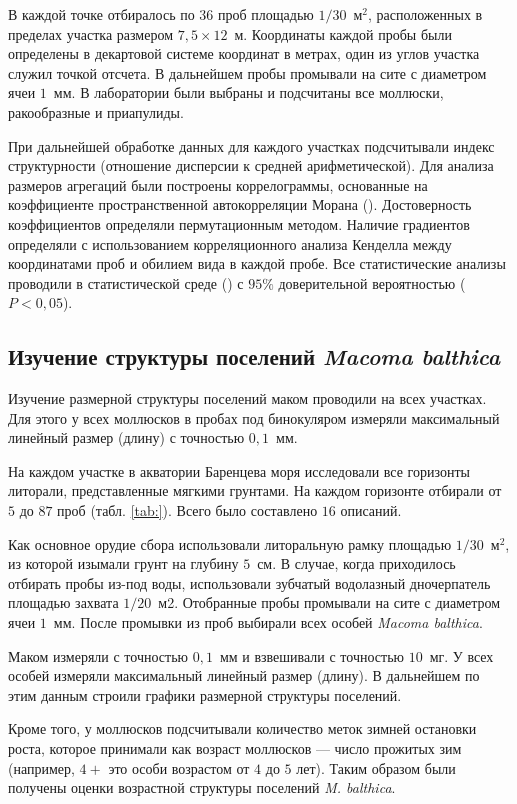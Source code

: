 В каждой точке отбиралось по $36$ проб площадью $1/30$~м$^2$, расположенных в пределах участка размером $7,5 \times 12$~м. 
Координаты каждой пробы были определены в декартовой системе координат в метрах, один из углов участка служил точкой отсчета. 
В дальнейшем пробы промывали на сите с диаметром ячеи $1$~мм. 
В лаборатории были выбраны и  подсчитаны все моллюски, ракообразные и приапулиды.

При дальнейшей обработке данных для каждого участках подсчитывали индекс структурности (отношение дисперсии к средней арифметической). 
Для анализа размеров агрегаций были построены коррелограммы, основанные на коэффициенте пространственной автокорреляции Морана (\cite{ncf}).
Достоверность коэффициентов определяли пермутационным методом.
Наличие градиентов определяли с использованием корреляционного анализа Кенделла между координатами проб и обилием вида в каждой пробе. 
Все статистические анализы проводили в статистической среде \R{} (\cite{R_2014}) с $95\%$ доверительной вероятностью ($P < 0,05$).



	
	\subsection{Изучение структуры поселений {\it Macoma balthica}}
Изучение размерной структуры поселений маком проводили на всех участках.
Для этого у всех моллюсков в пробах под бинокуляром измеряли максимальный линейный размер (длину) с точностью $0,1$~мм.

  На каждом участке в акватории Баренцева моря исследовали все  горизонты литорали, представленные мягкими грунтами.  
На каждом горизонте отбирали от $5$ до $87$ проб  (табл.  \ref{tab:}). Всего было составлено $16$ описаний.

Как основное орудие сбора использовали литоральную рамку площадью $1/30$~м$^2$, из которой изымали грунт на глубину $5$~см. 
В случае, когда приходилось отбирать пробы из-под воды, использовали зубчатый водолазный дночерпатель площадью захвата $1/20$~м2.
Отобранные пробы промывали на сите с диаметром ячеи $1$~мм. 
После промывки из   проб   выбирали   всех   особей  {\it Macoma balthica}.

   Маком   измеряли  с точностью $0,1$~мм  и взвешивали с точностью $10$~мг.
 У всех особей измеряли максимальный линейный размер (длину). 
В дальнейшем по этим данным строили графики размерной структуры поселений. 

Кроме того, у моллюсков подсчитывали количество меток зимней остановки роста, которое принимали как возраст моллюсков --- число прожитых зим (например, $4+$ это  особи возрастом от $4$ до $5$ лет).   
Таким   образом   были   получены   оценки возрастной структуры поселений {\it M. balthica}.

